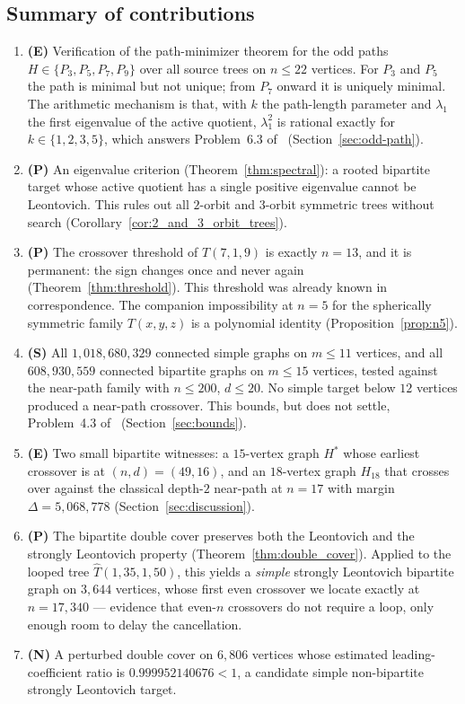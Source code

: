 \subsection{Summary of contributions}

\begin{enumerate}[label=(\roman*)]
  \item \textbf{(E)} Verification of the path-minimizer theorem for the
    odd paths $H \in \{P_3,P_5,P_7,P_9\}$ over all source trees on
    $n \le 22$ vertices. For $P_3$ and $P_5$ the path is minimal but
    not unique; from $P_7$ onward it is uniquely minimal. The
    arithmetic mechanism is that, with $k$ the path-length parameter
    and $\lambda_1$ the first eigenvalue of the active quotient,
    $\lambda_1^2$ is rational exactly for
    $k \in \{1,2,3,5\}$, which answers Problem~6.3 of~\cite{galvin2026}
    (Section~\ref{sec:odd-path}).
  \item \textbf{(P)} An eigenvalue criterion (Theorem~\ref{thm:spectral}):
    a rooted bipartite target whose active quotient has a single
    positive eigenvalue cannot be Leontovich. This rules out all
    $2$-orbit and $3$-orbit symmetric trees without search
    (Corollary~\ref{cor:2_and_3_orbit_trees}).
  \item \textbf{(P)} The crossover threshold of $T(7,1,9)$ is exactly
    $n = 13$, and it is permanent: the sign changes once and never
    again (Theorem~\ref{thm:threshold}). This threshold was already
    known in correspondence. The companion impossibility at $n = 5$ for
    the spherically symmetric family $T(x,y,z)$ is a polynomial
    identity (Proposition~\ref{prop:n5}).
  \item \textbf{(S)} All $1{,}018{,}680{,}329$ connected simple graphs on
    $m \le 11$ vertices, and all $608{,}930{,}559$ connected bipartite
    graphs on $m \le 15$ vertices, tested against the near-path family
    with $n \le 200$, $d \le 20$. No simple target below $12$ vertices
    produced a near-path crossover. This bounds, but does not settle,
    Problem~4.3 of~\cite{galvin2025} (Section~\ref{sec:bounds}).
  \item \textbf{(E)} Two small bipartite witnesses: a $15$-vertex graph
    $H^*$ whose earliest crossover is at $(n,d) = (49,16)$, and an
    $18$-vertex graph $H_{18}$ that crosses over against the classical
    depth-$2$ near-path at $n = 17$ with margin
    $\Delta = 5{,}068{,}778$ (Section~\ref{sec:discussion}).
  \item \textbf{(P)} The bipartite double cover preserves both the
    Leontovich and the strongly Leontovich property
    (Theorem~\ref{thm:double_cover}). Applied to the looped tree
    $\hat T(1,35,1,50)$, this yields a \emph{simple} strongly Leontovich
    bipartite graph on $3{,}644$ vertices, whose first even crossover we
    locate exactly at $n = 17{,}340$ --- evidence that even-$n$
    crossovers do not require a loop, only enough room to delay the
    cancellation.
  \item \textbf{(N)} A perturbed double cover on $6{,}806$ vertices whose
    estimated leading-coefficient ratio is $0.999952140676 < 1$,
    a candidate simple non-bipartite strongly Leontovich target.
\end{enumerate}


